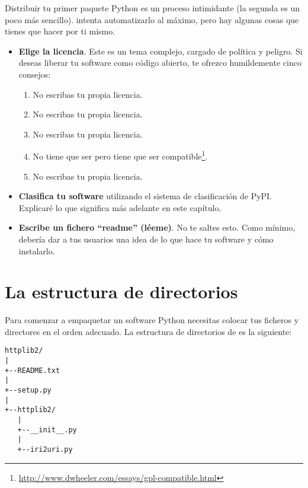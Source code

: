 Distribuir tu primer paquete Python es un proceso intimidante (la segunda es un poco más sencillo).  intenta automatizarlo al máximo, pero hay algunas cosas que tienes que hacer por ti mismo.

\begin{itemize}
  \item \textbf{Elige la licencia}. Este es un tema complejo, cargado de política y peligro. Si deseas liberar tu software como código abierto, te ofrezco humildemente cinco consejos:

    \begin{enumerate}
      \item No escribas tu propia licencia.
      \item No escribas tu propia licencia.
      \item No escribas tu propia licencia.
      \item No tiene que ser  pero tiene que ser compatible\footnote{\href{http://www.dwheeler.com/essays/gpl-compatible.html}{http://www.dwheeler.com/essays/gpl-compatible.html}}.
      \item No escribas tu propia licencia.
    \end{enumerate}

  \item \textbf{Clasifica tu software} utilizando el sistema de clasificación de PyPI. Explicaré lo que significa más adelante en este capítulo.
  \item \textbf{Escribe un fichero ``readme'' (léeme)}. No te saltes esto. Como mínimo, debería dar a tus usuarios una idea de lo que hace tu software y cómo instalarlo.
\end{itemize}

\section{La estructura de directorios}

Para comenzar a empaquetar un software Python necesitas colocar tus ficheros y directores en el orden adecuado. La estructura de directorios de  es la siguiente:


\begin{lstlisting}[breaklines=true]
httplib2/                 
|
+--README.txt            
|
+--setup.py             
|
+--httplib2/           
   |
   +--__init__.py
   |
   +--iri2uri.py
\end{lstlisting}

